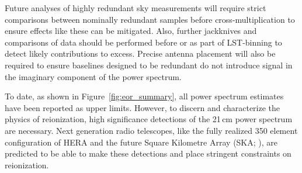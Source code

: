 Future analyses of highly redundant sky
measurements will require strict comparisons
between nominally redundant samples before
cross-multiplication to ensure effects like
these can be mitigated. Also, further jackknives
and comparisons of data should be performed before or as part of LST-binning
to detect likely contributions to excess.
Precise antenna placement will also be required
to ensure baselines designed to be redundant do not
introduce signal in the imaginary component of the power spectrum.

To date, as shown in Figure~\ref{fig:eor_summary}, all power spectrum estimates have been reported as
upper limits. However, to discern and characterize the physics
of reionization, high significance detections of the 21\,cm power
spectrum are necessary.
Next generation radio telescopes,
like the fully realized 350 element configuration of HERA
\citep{pober_et_al2014,deboer_et_al2017,liu_parsons_2016}
and the
future Square Kilometre Array (SKA; \citet{mellema:2013}), are predicted to
be able to make these detections and place stringent constraints
on reionization.



